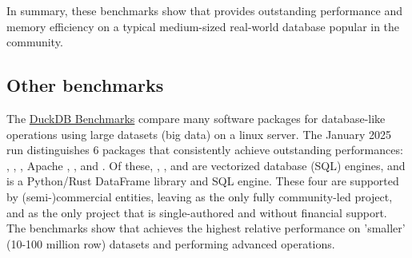 \documentclass[nojss]{jss} %
\begin{document}
In summary, these benchmarks show that  provides outstanding performance and memory efficiency on a typical medium-sized real-world database popular in the  community.
%
%
%
%
\subsection{Other benchmarks}
%
The \href{https://duckdblabs.github.io/db-benchmark/}{DuckDB Benchmarks} compare many software packages for database-like operations using large datasets (big data) on a linux server. The January 2025 run distinguishes 6 packages that consistently achieve outstanding performances: , , , Apache , , and . Of these, , , and  are vectorized database (SQL) engines, and  is a Python/Rust DataFrame library and SQL engine. These four are supported by (semi-)commercial entities, leaving  as the only fully community-led project, and  as the only project that is single-authored and without financial support. The benchmarks show that  achieves the highest relative performance on 'smaller' (10-100 million row) datasets and performing advanced operations. \newline
\end{document}
